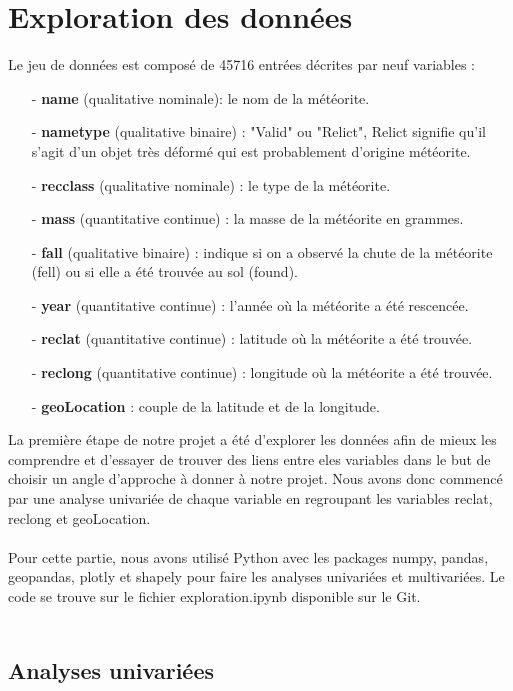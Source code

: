 \documentclass[12pt]{article}
\begin{document}
\section{Exploration des données}
Le jeu de données est composé de 45716 entrées décrites par neuf variables :
\begin{itemize}
\item[-] \textbf{name} (qualitative nominale): le nom de la météorite.
\item[-] \textbf{nametype} (qualitative binaire) : "Valid" ou "Relict", Relict signifie qu'il s'agit d'un objet très déformé qui est probablement d'origine météorite.
\item[-] \textbf{recclass} (qualitative nominale) : le type de la météorite.
\item[-] \textbf{mass} (quantitative continue) : la masse de la météorite en grammes.
\item[-] \textbf{fall} (qualitative binaire) : indique si on a observé la chute de la météorite (fell) ou si elle a été trouvée au sol (found).
\item[-] \textbf{year} (quantitative continue) : l'année où la météorite a été rescencée.
\item[-] \textbf{reclat} (quantitative continue) : latitude où la météorite a été trouvée.
\item[-] \textbf{reclong} (quantitative continue) : longitude où la météorite a été trouvée.
\item[-]\textbf{geoLocation} : couple de la latitude et de la longitude.\\
\end{itemize}
La première étape de notre projet a été d'explorer les données afin de mieux les comprendre et d'essayer de trouver des liens entre eles variables dans le but de choisir un angle d'approche à donner à notre projet. Nous avons donc commencé par une analyse univariée de chaque variable en regroupant les variables reclat, reclong et geoLocation.\\
\\
Pour cette partie, nous avons utilisé Python avec les packages numpy, pandas, geopandas, plotly et shapely pour faire les analyses univariées et multivariées. Le code se trouve sur le fichier exploration.ipynb disponible sur le Git.\\
\\
\subsection{Analyses univariées}
\end{document}
